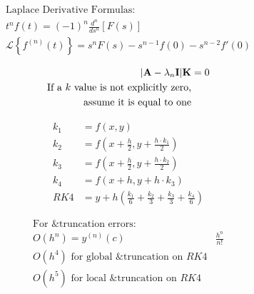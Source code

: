 \documentclass[12pt]{article}
\begin{document}
\begin{multicols}{2}

  \begin{equation*}
    \begin{split}
      \text{Laplace Derivative Formulas:}\\
      t^nf(t)=(-1)^n\frac{d^n}{ds^n}[F(s)]\\
      \mathcal{L}\left\{ f^{(n)}(t) \right\}=s^nF(s)-s^{n-1}f(0)-s^{n-2}f'(0)
    \end{split}
    \label{5}
  \end{equation*}

  \begin{equation*}
    \begin{split}
      |\bold{A}-\lambda_n\bold{I}|\bold{K}&=0\\
      \text{If a }k\text{ value is not explicitly zero,}\\
      \text{assume it is equal to one}
    \end{split}
    \label{6}
  \end{equation*}

\end{multicols}

\begin{multicols}{2}

  \begin{equation*}
    \begin{split}
      k_1&=f\left(x,y\right)\\
      k_2&=f\left(x+\frac{h}{2},y+\frac{h\cdot k_1}{2}\right)\\
      k_3&=f\left(x+\frac{h}{2},y+\frac{h\cdot k_2}{2}\right)\\
      k_4&=f\left(x+h,y+h\cdot k_3\right)\\
      RK4&=y+h\left( \frac{k_1}{6}+\frac{k_2}{3}+\frac{k_3}{3}+\frac{k_4}{6} \right)
    \end{split}
    \label{7}
  \end{equation*}

  \begin{equation*}
    \begin{split}
      \text{For &truncation errors:}\\
      O(h^n)=y^{(n)}\left( c \right)&\frac{h^n}{n!}\\
      O(h^4)\text{ for global &truncation on } RK4\\
      O(h^5)\text{ for local &truncation on } RK4\\
    \end{split}
    \label{8}
  \end{equation*}


\end{multicols}
\end{document}
